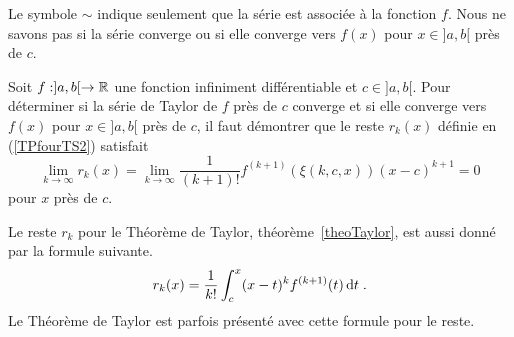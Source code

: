 {\begin{focus}{\dfn}
Le symbole $\sim$ indique seulement que la série est associée à la fonction
$f$.  Nous ne savons pas si la série converge ou si elle converge vers $f(x)$
pour $x\in]a,b[$ près de $c$.
\end{focus}

\begin{focus}{\mth}
Soit $f:]a,b[\rightarrow \mathbb{R}$ une fonction infiniment différentiable et
$c \in ]a,b[$.  Pour déterminer si la série de Taylor de $f$ près de $c$
converge et si elle converge vers $f(x)$ pour $x\in]a,b[$ près de $c$, il
faut démontrer que le reste $r_k(x)$ définie en (\ref{TPfourTS2}) satisfait
\[
\lim_{k\rightarrow \infty} r_k(x) =
\lim_{k\rightarrow \infty}
\frac{1}{(k+1)!} f^{(k+1)}(\xi(k,c,x)) (x-c)^{k+1} = 0
\]
pour $x$ près de $c$.
\end{focus}

\begin{rmk}[\theory]
Le reste $r_k$ pour le Théorème de Taylor, théorème~\ref{theoTaylor}, est
aussi donné par la formule suivante.
\begin{equation}\label{TRest}
r_k(x) = \frac{1}{k!} \int_c^x (x-t)^k f^{(k+1)}(t) \,\mathrm{d}t \; .
\end{equation}
Le Théorème de Taylor est parfois présenté avec cette formule pour le 
reste.


\end{rmk}}
